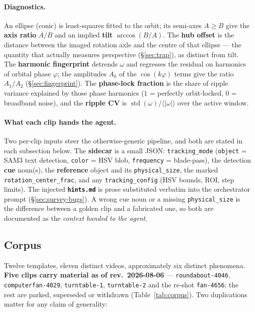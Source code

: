 \documentclass[11pt,a4paper]{article}
\begin{document}
\paragraph{Diagnostics.} An ellipse (conic) is least-squares fitted to the orbit; its semi-axes
$A \ge B$ give the \textbf{axis ratio} $A/B$ and an implied \textbf{tilt} $\arccos(B/A)$. The
\textbf{hub offset} is the distance between the imaged rotation axle and the centre of that ellipse
--- the quantity that actually measures perspective (\S\ref{sec:trap}), as distinct from tilt. The
\textbf{harmonic fingerprint} detrends $\omega$ and regresses the residual on harmonics of orbital
phase $\varphi$; the amplitudes $A_k$ of the $\cos(k\varphi)$ terms give the ratio $A_1/A_2$
(\S\ref{sec:fingerprint}). The \textbf{phase-lock fraction} is the share of ripple variance
explained by those phase harmonics ($1$ = perfectly orbit-locked, $0$ = broadband noise), and the
\textbf{ripple CV} is $\operatorname{std}(\omega)/\langle|\omega|\rangle$ over the active window.

\paragraph{What each clip hands the agent.} Two per-clip inputs steer the otherwise-generic
pipeline, and both are stated in each subsection below. The \textbf{sidecar} is a small JSON:
\texttt{tracking\_mode} (\texttt{object} = SAM3 text detection, \texttt{color} = HSV blob,
\texttt{frequency} = blade-pass), the detection \textbf{cue} noun(s), the \textbf{reference} object
and its \texttt{physical\_size}, the marked \texttt{rotation\_center\_frac}, and any
\texttt{tracking\_config} (HSV bounds, ROI, step limits). The injected \textbf{\texttt{hints.md}}
is prose substituted verbatim into the orchestrator prompt (\S\ref{sec:survey-bugs}). A wrong cue
noun or a missing \texttt{physical\_size} is the difference between a golden clip and a fabricated
one, so both are documented as the \emph{context handed to the agent}.

\subsection{Corpus}

Twelve templates, eleven distinct videos, approximately six distinct phenomena. \textbf{Five
clips carry material as of rev.\ 2026-08-06} --- \texttt{roundabout-4046},
\texttt{computerfan-4029}, \texttt{turntable-1}, \texttt{turntable-2} and the re-shot
\texttt{fan-4656}; the rest are parked, superseded or withdrawn (Table~\ref{tab:corpus}). Two
duplications matter for any claim of generality:
\end{document}
